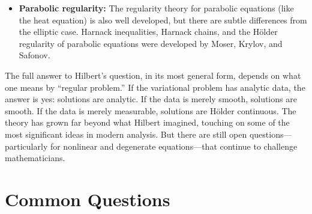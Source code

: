 \begin{solvedbox}
\begin{itemize}
    \item \textbf{Parabolic regularity:} The regularity theory for parabolic equations (like the heat equation) is also well developed, but there are subtle differences from the elliptic case. Harnack inequalities, Harnack chains, and the H\"older regularity of parabolic equations were developed by Moser, Krylov, and Safonov.
\end{itemize}

The full answer to Hilbert's question, in its most general form, depends on what one means by ``regular problem.'' If the variational problem has analytic data, the answer is yes: solutions are analytic. If the data is merely smooth, solutions are smooth. If the data is merely measurable, solutions are H\"older continuous. The theory has grown far beyond what Hilbert imagined, touching on some of the most significant ideas in modern analysis. But there are still open questions---particularly for nonlinear and degenerate equations---that continue to challenge mathematicians.
\end{solvedbox}

\section*{Common Questions}

